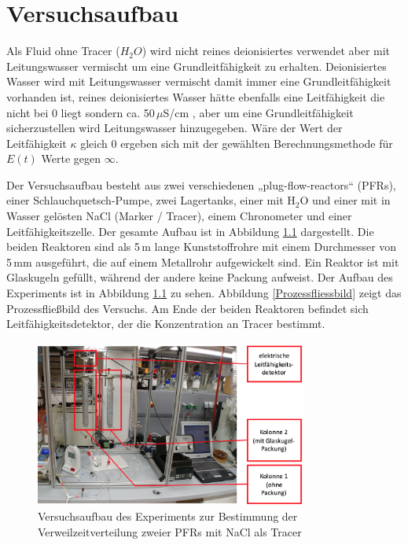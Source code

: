 \documentclass[12pt,liststotoc]{report}
\begin{document}
\chapter{Versuchsaufbau}


Als Fluid ohne Tracer ($H_2O$) wird nicht reines deionisiertes verwendet aber mit Leitungswasser vermischt um eine Grundleitfähigkeit zu erhalten. Deionisiertes Wasser wird mit Leitungswasser vermischt damit immer eine Grundleitfähigkeit vorhanden ist, reines deionisiertes Wasser hätte ebenfalls eine Leitfähigkeit die nicht bei 0 liegt sondern ca. 50\,$\mu$S/cm \cite{Leitfahigkeit_Wasser}, aber um eine Grundleitfähigkeit sicherzustellen wird Leitungswasser hinzugegeben. Wäre der Wert der Leitfähigkeit $\kappa$ gleich 0 ergeben sich mit der gewählten Berechnungsmethode für $E(t)$ Werte gegen $\infty$.


Der Versuchsaufbau besteht aus zwei verschiedenen „plug-flow-reactors“ (PFRs), einer Schlauchquetsch-Pumpe, zwei Lagertanks, einer mit H$_2$O und einer mit in Wasser gelösten NaCl (Marker / Tracer), einem Chronometer und einer Leitfähigkeitszelle. Der gesamte Aufbau ist in Abbildung \ref{Versuchsaufbau} dargestellt.
Die beiden Reaktoren sind als 5\,m lange Kunststoffrohre mit einem Durchmesser von 5\,mm ausgeführt, die auf einem Metallrohr aufgewickelt sind. Ein Reaktor ist mit Glaskugeln gefüllt, während der andere keine Packung aufweist. Der Aufbau des Experiments ist in Abbildung \ref{Versuchsaufbau} zu sehen. Abbildung \ref{Prozessfliessbild} zeigt das Prozessfließbild des Versuchs. Am Ende der beiden Reaktoren befindet sich Leitfähigkeitsdetektor, der die Konzentration an Tracer bestimmt.

\begin{figure}[H]
\centering
\includegraphics[width=0.8\textwidth]{Graphics/Versuchsaufbau.png} 
\caption[Versuchsaufbau des Experiments zur Bestimmung der Verweilzeitverteilung zweier PFRs mit NaCl als Tracer]{Versuchsaufbau des Experiments zur Bestimmung der Verweilzeitverteilung zweier PFRs mit NaCl als Tracer \cite{Skript_2018}}
\label{Versuchsaufbau}
\end{figure}
\noindent
\end{document}
